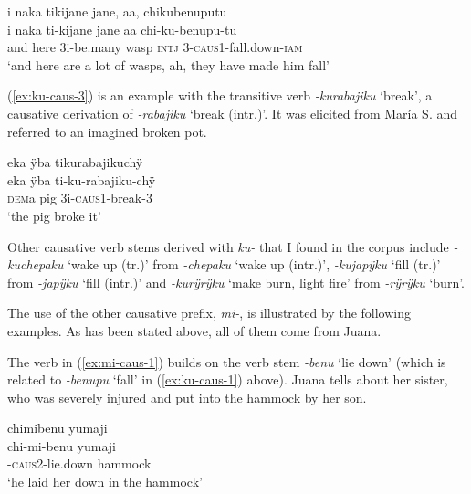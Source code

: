 \ea\label{ex:ku-caus-1}
\begingl
\glpreamble i naka tikijane jane, aa, chikubenuputu\\
\gla i naka ti-kijane jane aa chi-ku-benupu-tu\\
\glb and here 3i-be.many wasp \textsc{intj} 3-\textsc{caus}1-fall.down-\textsc{iam}\\
\glft ‘and here are a lot of wasps, ah, they have made him fall’
\endgl
\trailingcitation{[jxx-a120516l-a.130]}%
\xe

(\ref{ex:ku-caus-3}) is an example with the transitive verb \textit{-kurabajiku} ‘break’, a causative derivation of  \textit{-rabajiku} ‘break (intr.)’. It was elicited from María S. and referred to an imagined broken pot.

\ea\label{ex:ku-caus-3}
\begingl
\glpreamble eka ÿba tikurabajikuchÿ\\
\gla eka ÿba ti-ku-rabajiku-chÿ\\
\glb \textsc{dem}a pig 3i-\textsc{caus}1-break-3\\
\glft ‘the pig broke it’
\endgl
\trailingcitation{[rxx-e181024l.029]}
\xe


Other causative verb stems derived with \textit{ku-} that I found in the corpus include \textit{-kuchepaku} ‘wake up (tr.)’ from \textit{-chepaku} ‘wake up (intr.)’, \mbox{\textit{-kujapÿku}} ‘fill (tr.)’ from \mbox{\textit{-japÿku}} ‘fill (intr.)’ and \textit{-kurÿrÿku} ‘make burn, light fire’ from \textit{-rÿrÿku} ‘burn’. 

The use of the other causative prefix, \textit{mi-}, is illustrated by the following examples. As has been stated above, all of them come from Juana.

The verb in (\ref{ex:mi-caus-1}) builds on the verb stem \textit{-benu} ‘lie down’ (which is related to \mbox{\textit{-benupu}} ‘fall’ in (\ref{ex:ku-caus-1}) above). Juana tells about her sister, who was severely injured and put into the hammock by her son.

\ea\label{ex:mi-caus-1}
\begingl
\glpreamble chimibenu yumaji\\
\gla chi-mi-benu yumaji\\
-\textsc{caus}2-lie.down hammock\\
\glft ‘he laid her down in the hammock’
\endgl
\trailingcitation{[jxx-p120430l-2.194]}%
\xe

